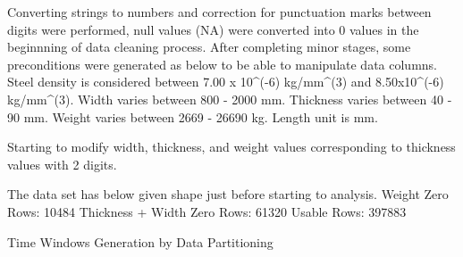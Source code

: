 \documentclass{article}
\begin{document}
Converting strings to numbers and correction for punctuation marks between digits were performed, null values (NA) were converted into $0$ values in the beginnning of data cleaning process. After completing minor stages, some preconditions were generated as below to be able to manipulate data columns.
Steel density is considered between 7.00 x 10^(-6) kg/mm^(3) and 8.50x10^(-6) kg/mm^(3).
Width varies between 800 - 2000 mm. 
Thickness varies between 40 - 90 mm. 
Weight varies between 2669 - 26690 kg.
Length unit is mm.

Starting to modify width, thickness, and weight values corresponding to thickness values with 2 digits.

The data set has below given shape just before starting to analysis.
Weight Zero Rows: 10484
Thickness + Width Zero Rows: 61320
Usable Rows: 397883

Time Windows Generation by Data Partitioning
\end{document}
